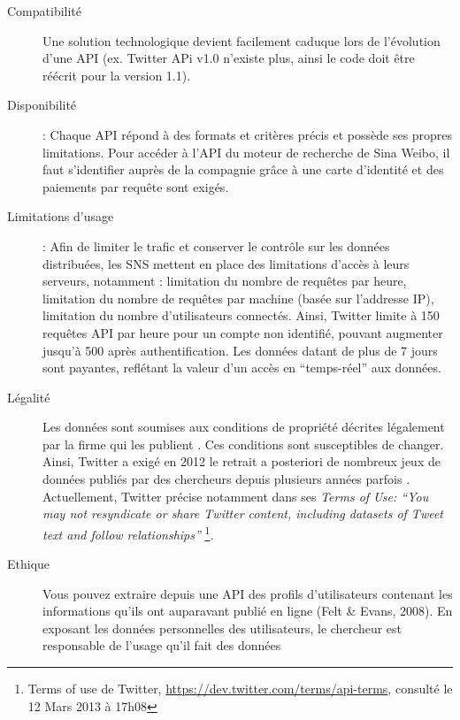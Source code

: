 \begin{description}
    
    \item[Compatibilit\'e] Une solution technologique devient
    facilement caduque lors de l{\textquoteright}\'evolution
    d{\textquoteright}une API (ex. Twitter APi v1.0
    n{\textquoteright}existe plus, ainsi le code doit \^etre r\'e\'ecrit
    pour la version 1.1). 
    
    \item [Disponibilit\'e] : Chaque API r\'epond \`a
    des formats et crit\`eres pr\'ecis et poss\`ede ses propres
    limitations. Pour acc\'eder \`a l{\textquoteright}API du moteur de
    recherche de Sina Weibo, il faut s{\textquoteright}identifier aupr\`es
    de la compagnie gr\^ace \`a une carte d{\textquoteright}identit\'e et
    des paiements par requ\^ete sont exig\'es. 
    
    \item[Limitations d{\textquoteright}usage] : Afin de limiter le
    trafic et conserver le contr\^ole sur les donn\'ees distribu\'ees, les
    SNS mettent en place des limitations d{\textquoteright}acc\`es \`a
    leurs serveurs, notamment : limitation du nombre de requ\^etes par
    heure, limitation du nombre de requ\^etes par machine (bas\'ee sur
    l{\textquoteright}addresse IP), limitation du nombre
    d{\textquoteright}utilisateurs connect\'es. Ainsi, Twitter limite \`a
    150 requ\^etes API par heure pour un compte non identifi\'e, pouvant
    augmenter jusqu{\textquoteright}\`a 500 apr\`es authentification. Les
    donn\'ees datant de plus de 7 jours sont payantes, refl\'etant la
    valeur d{\textquoteright}un acc\`es en
    {\textquotedblleft}temps-r\'eel{\textquotedblright} aux donn\'ees.
    
    \item[L\'egalit\'e ] Les donn\'ees sont soumises aux conditions
    de propri\'et\'e d\'ecrites l\'egalement par la firme qui les publient
    \citep{Clifton2006}. Ces conditions sont susceptibles de changer. Ainsi,
    Twitter a exig\'e en 2012 le retrait a posteriori de nombreux jeux de
    donn\'ees publi\'es par des chercheurs depuis plusieurs ann\'ees
    parfois \citep{McCreadie2012}. Actuellement, Twitter pr\'ecise notamment
    dans ses \textit{Terms of Use: {\textquotedblleft}You may not
    resyndicate or share Twitter content, including datasets of Tweet text
    and follow relationships{\textquotedblright} }\footnote{ Terms of use
    de Twitter, \url{https://dev.twitter.com/terms/api-terms}, consult\'e
    le 12 Mars 2013 \`a 17h08}\textit{. ~}
    
    \item[Ethique] Vous pouvez extraire depuis une API des profils
    d{\textquoteright}utilisateurs contenant les informations
    qu{\textquoteright}ils ont auparavant publi\'e en ligne (Felt \& Evans,
    2008). En exposant les donn\'ees personnelles des utilisateurs, le
    chercheur est responsable de l{\textquoteright}usage
    qu{\textquoteright}il fait des donn\'ees \citep{Rieder2005} 
\end{description}

